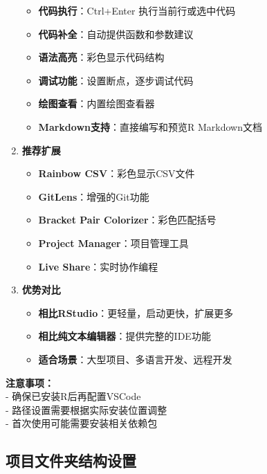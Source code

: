 \documentclass[
  twoside]{book}
\providecommand{\tightlist}{%
  \setlength{\itemsep}{0pt}\setlength{\parskip}{0pt}}
\begin{document}
\begin{enumerate}
  \begin{itemize}
  \tightlist
  \item
    \textbf{代码执行}：Ctrl+Enter 执行当前行或选中代码
  \item
    \textbf{代码补全}：自动提供函数和参数建议
  \item
    \textbf{语法高亮}：彩色显示代码结构
  \item
    \textbf{调试功能}：设置断点，逐步调试代码
  \item
    \textbf{绘图查看}：内置绘图查看器
  \item
    \textbf{Markdown支持}：直接编写和预览R Markdown文档
  \end{itemize}
\item
  \textbf{推荐扩展}

  \begin{itemize}
  \tightlist
  \item
    \textbf{Rainbow CSV}：彩色显示CSV文件
  \item
    \textbf{GitLens}：增强的Git功能
  \item
    \textbf{Bracket Pair Colorizer}：彩色匹配括号
  \item
    \textbf{Project Manager}：项目管理工具
  \item
    \textbf{Live Share}：实时协作编程
  \end{itemize}
\item
  \textbf{优势对比}

  \begin{itemize}
  \tightlist
  \item
    \textbf{相比RStudio}：更轻量，启动更快，扩展更多
  \item
    \textbf{相比纯文本编辑器}：提供完整的IDE功能
  \item
    \textbf{适合场景}：大型项目、多语言开发、远程开发
  \end{itemize}
\end{enumerate}

\textbf{注意事项：}\\
- 确保已安装R后再配置VSCode\\
- 路径设置需要根据实际安装位置调整\\
- 首次使用可能需要安装相关依赖包

\hypertarget{ux9879ux76eeux6587ux4ef6ux5939ux7ed3ux6784ux8bbeux7f6e}{%
\subsection{项目文件夹结构设置}\label{ux9879ux76eeux6587ux4ef6ux5939ux7ed3ux6784ux8bbeux7f6e}}
\end{document}
